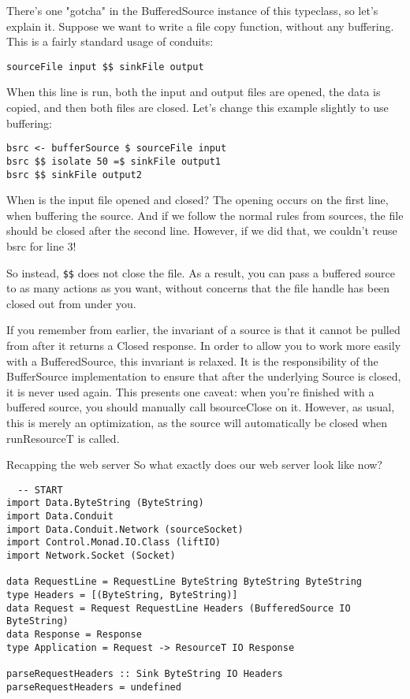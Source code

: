 \begin{verbaim}
There's one "gotcha" in the BufferedSource instance of this typeclass, so
let's explain it. Suppose we want to write a file copy function, without any buffering.
This is a
fairly standard usage of conduits:
\begin{lstlisting}
sourceFile input $$ sinkFile output
\end{lstlisting}
When this line is run, both the input and output files are opened, the data is copied, and
then
both files are closed. Let's change this example slightly to use buffering:
\begin{lstlisting}
bsrc <- bufferSource $ sourceFile input
bsrc $$ isolate 50 =$ sinkFile output1
bsrc $$ sinkFile output2
\end{lstlisting}
When is the input file opened and closed? The opening occurs on the first line, when
buffering
the source. And if we follow the normal rules from sources, the file should be closed
after the
second line. However, if we did that, we couldn't reuse bsrc for line 3!

So instead, \verb#$$# does not close the file. As a result, you can pass a
buffered source to as many actions as you want, without concerns that the file handle has
been
closed out from under you.

If you remember from earlier, the invariant of a source is that it cannot be pulled from
after it returns a Closed response. In order to allow you to work more easily
with a BufferedSource, this invariant is relaxed. It is the responsibility of
the BufferSource implementation to ensure that after the underlying
Source is closed, it is never used again.
This presents one caveat: when you're finished with a buffered source, you should manually
call
bsourceClose on it. However, as usual, this is merely an optimization, as the
source will automatically be closed when runResourceT is called.

Recapping the web server
So what exactly does our web server look like now?
\begin{lstlisting}
  -- START
import Data.ByteString (ByteString)
import Data.Conduit
import Data.Conduit.Network (sourceSocket)
import Control.Monad.IO.Class (liftIO)
import Network.Socket (Socket)

data RequestLine = RequestLine ByteString ByteString ByteString
type Headers = [(ByteString, ByteString)]
data Request = Request RequestLine Headers (BufferedSource IO ByteString)
data Response = Response
type Application = Request -> ResourceT IO Response

parseRequestHeaders :: Sink ByteString IO Headers
parseRequestHeaders = undefined


\end{lstlisting}
\end{verbaim}
